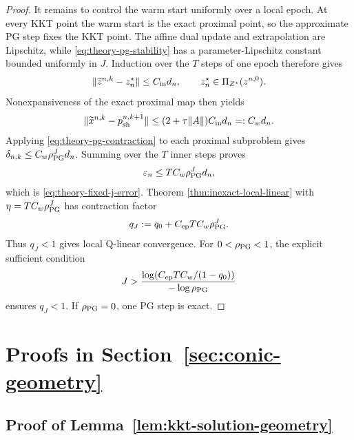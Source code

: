\documentclass[letterpaper]{article} %
\theoremstyle{definition}
\theoremstyle{remark}
\begin{document}
\begin{proof}
It remains to control the warm start uniformly over a local epoch.  At every
KKT point the warm start is the exact proximal point, so the approximate PG
step fixes the KKT point.  The affine dual update and extrapolation are
Lipschitz, while \eqref{eq:theory-pg-stability} has a
parameter-Lipschitz constant bounded uniformly in $J$.  Induction over the $T$ steps of one epoch therefore gives
\[
    \|\widetilde z^{n,k}-z_n^\star\|
    \le
    C_{\rm in}d_n,
    \qquad
    z_n^\star\in\Pi_{Z^\star}(z^{n,0}).
\]
Nonexpansiveness of the exact proximal map then yields
\[
    \|\widetilde x^{n,k}-p_{\rm sh}^{n,k+1}\|
    \le
    (2+\tau\|A\|)C_{\rm in}d_n
    =:
    C_wd_n.
\]
Applying \eqref{eq:theory-pg-contraction} to each proximal subproblem gives
$\delta_{n,k}\le C_w\rho_{\rm PG}^Jd_n$.  Summing over the $T$ inner steps
proves
\[
    \varepsilon_n
    \le
    T C_w\rho_{\rm PG}^Jd_n,
\]
which is \eqref{eq:theory-fixed-j-error}.  Theorem
\ref{thm:inexact-local-linear} with
$\eta=T C_w\rho_{\rm PG}^J$ has contraction factor
\[
    q_J
    :=
    q_0+C_{\rm ep}T C_w\rho_{\rm PG}^J.
\]
Thus $q_J<1$ gives local Q-linear convergence.  For
$0<\rho_{\rm PG}<1$, the explicit sufficient condition
\begin{equation}
\label{eq:theory-fixed-j-choice}
    J
    >
    \frac{
        \log\!\left(C_{\rm ep}T C_w/(1-q_0)\right)
    }{
        -\log\rho_{\rm PG}
    }
\end{equation}
ensures $q_J<1$.  If $\rho_{\rm PG}=0$, one PG step is exact.
\end{proof}


\section{Proofs in Section~\ref{sec:conic-geometry}}
\label{app:sec3-proofs}

\subsection{Proof of Lemma~\ref{lem:kkt-solution-geometry}}
\label{app:proof-kkt-solution-geometry}
\end{document}
